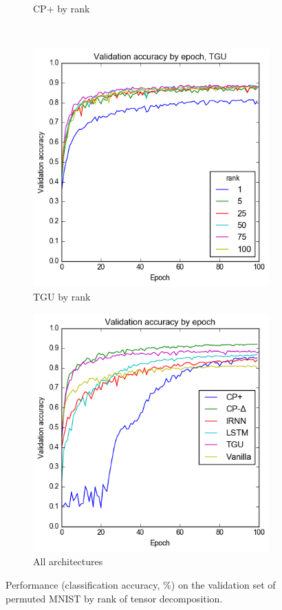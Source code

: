 \begin{figure}
\begin{subfigure}[t]{0.45\textwidth}
	\caption{CP+ by rank}
	\label{fig:cp+rank}
\end{subfigure}\\
\begin{subfigure}[t]{0.45\textwidth}
	\includegraphics[width=\textwidth]{exps/mnist/tgurank}
	\caption{TGU by rank}
\end{subfigure}
\begin{subfigure}[t]{0.45\textwidth}
	\includegraphics[width=\textwidth]{exps/mnist/allarchs}
	\caption{All architectures}
\end{subfigure}

\caption[Permuted MNIST results]{Performance (classification accuracy, \%)
 on the validation set of permuted MNIST
by rank of tensor decomposition.}
\label{fig:pmnistrank}
\end{figure}

